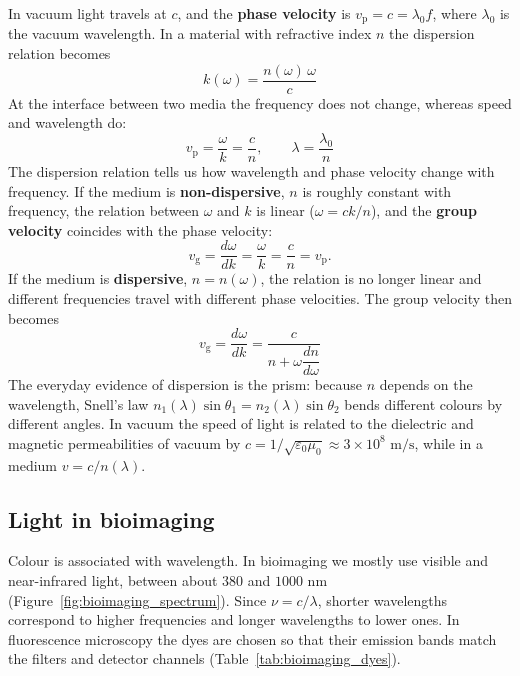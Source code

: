 \documentclass[letterpaper,11pt,leqno]{book}
\begin{document}
In vacuum light travels at $c$, and the \textbf{phase velocity} is $v_{\text{p}} = c = \lambda_0 f$, where $\lambda_0$ is the vacuum wavelength. In a material with refractive index $n$ the dispersion relation becomes
\begin{equation}
\boxed{k(\omega) = \frac{n(\omega)\,\omega}{c}}
\label{eq:dispersion_general}
\end{equation}
At the interface between two media the frequency does not change, whereas speed and wavelength do:
\begin{equation}
\boxed{v_{\text{p}} = \frac{\omega}{k} = \frac{c}{n}, \qquad \lambda = \frac{\lambda_0}{n}}
\label{eq:phase_velocity}
\end{equation}
The dispersion relation tells us how wavelength and phase velocity change with frequency. If the medium is \textbf{non-dispersive}, $n$ is roughly constant with frequency, the relation between $\omega$ and $k$ is linear ($\omega = ck/n$), and the \textbf{group velocity} coincides with the phase velocity:
\begin{equation}
v_{\text{g}} = \frac{d\omega}{dk} = \frac{\omega}{k} = \frac{c}{n} = v_{\text{p}}.
\label{eq:group_velocity_nondisp}
\end{equation}
If the medium is \textbf{dispersive}, $n = n(\omega)$, the relation is no longer linear and different frequencies travel with different phase velocities. The group velocity then becomes
\begin{equation}
\boxed{v_{\text{g}} = \frac{d\omega}{dk} = \frac{c}{n + \omega \dfrac{dn}{d\omega}}}
\label{eq:group_velocity_disp}
\end{equation}
The everyday evidence of dispersion is the prism: because $n$ depends on the wavelength, Snell's law $n_1(\lambda)\sin\theta_1 = n_2(\lambda)\sin\theta_2$ bends different colours by different angles. In vacuum the speed of light is related to the dielectric and magnetic permeabilities of vacuum by $c = 1/\sqrt{\varepsilon_0\mu_0} \approx 3 \times 10^8\text{ m/s}$, while in a medium $v = c/n(\lambda)$.

\subsection{Light in bioimaging}

Colour is associated with wavelength. In bioimaging we mostly use visible and near-infrared light, between about $380$ and $1000\text{ nm}$ (Figure~\ref{fig:bioimaging_spectrum}). Since $\nu = c/\lambda$, shorter wavelengths correspond to higher frequencies and longer wavelengths to lower ones. In fluorescence microscopy the dyes are chosen so that their emission bands match the filters and detector channels (Table~\ref{tab:bioimaging_dyes}).
\end{document}
